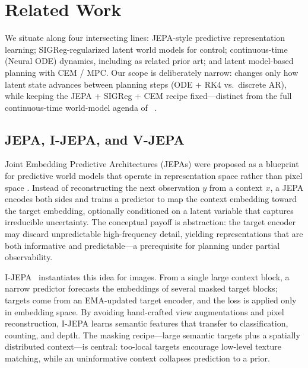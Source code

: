 \section{Related Work}
\label{sec:related}

We situate \method{} along four intersecting lines: JEPA-style predictive
representation learning; SIGReg-regularized latent world models for
control; continuous-time (Neural ODE) dynamics, including
\PriorODEWorld{} as related prior art; and latent model-based planning
with CEM / MPC.
Our scope is deliberately narrow: \method{} changes only how latent
state advances between planning steps (ODE + RK4 vs.\ discrete AR),
while keeping the JEPA + SIGReg + CEM recipe fixed---distinct from the
full continuous-time world-model agenda of
\PriorODEWorld{}~\cite{liu2026odeworld}.

\subsection{JEPA, I-JEPA, and V-JEPA}
\label{sec:rel-jepa}

Joint Embedding Predictive Architectures (JEPAs) were proposed as a
blueprint for predictive world models that operate in representation
space rather than pixel space
\cite{lecun2022path,assran2023jepa}.
Instead of reconstructing the next observation $y$ from a context $x$,
a JEPA encodes both sides and trains a predictor to map the context
embedding toward the target embedding, optionally conditioned on a
latent variable that captures irreducible uncertainty.
The conceptual payoff is abstraction: the target encoder may discard
unpredictable high-frequency detail, yielding representations that are
both informative and predictable---a prerequisite for planning under
partial observability.

I-JEPA~\cite{assran2023jepa} instantiates this idea for images.
From a single large context block, a narrow predictor forecasts the
embeddings of several masked target blocks; targets come from an
EMA-updated target encoder, and the loss is applied only in embedding
space.
By avoiding hand-crafted view augmentations and pixel reconstruction,
I-JEPA learns semantic features that transfer to classification,
counting, and depth.
The masking recipe---large semantic targets plus a spatially
distributed context---is central: too-local targets encourage
low-level texture matching, while an uninformative context collapses
prediction to a prior.

